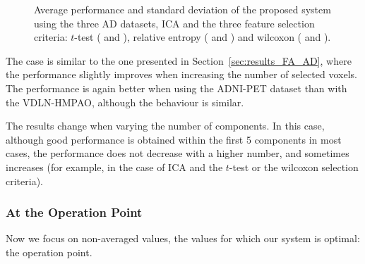 \begin{figure}
	
	\caption{Average performance and standard deviation of the proposed system using the three \ac{AD} datasets, \ac{ICA} and the three feature selection criteria: $t$-test (\protect{} and \protect{}), relative entropy (\protect{} and \protect{}) and wilcoxon (\protect{} and \protect{}). } 
	\label{fig:accuracyMeanICA-AD}
\end{figure}

The case is similar to the one presented in Section~\ref{sec:results_FA_AD}, where the performance slightly improves when increasing the number of selected voxels. The performance is again better when using the ADNI-PET dataset than with the VDLN-HMPAO, although the behaviour is similar. 

The results change when varying the number of components. In this case, although good performance is obtained within the first 5 components in most cases, the performance does not decrease with a higher number, and sometimes increases (for example, in the case of \ac{ICA} and the $t$-test or the wilcoxon selection criteria). 

\subsubsection{At the Operation Point}
Now we focus on non-averaged values, the values for which our system is optimal: the operation point. 

